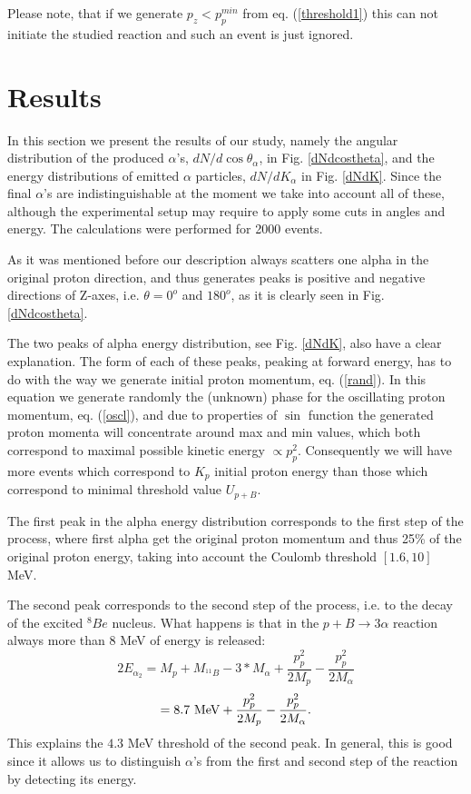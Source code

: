 \documentclass[aps,prc,twocolumn,floatfix,showpacs,a4paper,
nofootinbib,amsmath,amssymb]{revtex4}
\newcommand{\be}{\begin{equation}}
\newcommand{\ee}{\end{equation}}
\begin{document}
Please note, that if we generate $p_z < p_p^{min}$ from eq. (\ref{threshold1}) this can not initiate the studied reaction and such an event is just ignored.  


\section{Results}



In this section we present the results of our study, namely the angular distribution of the produced $\alpha$'s, $dN/d\cos\theta_\alpha$,  in Fig. \ref{dNdcostheta},  and the energy distributions of emitted $\alpha$ particles, $dN/dK_{\alpha}$ in Fig. \ref{dNdK}. Since the final $\alpha$'s are indistinguishable at the moment we take into account all of these, although the experimental setup may require to apply some cuts in angles and energy. The calculations were performed for 2000 events.  

As it was mentioned before our description always scatters one alpha in the original proton direction, and thus generates peaks is positive and negative directions of Z-axes, i.e. $\theta=0^o$ and $180^o$, as it is clearly seen in Fig. \ref{dNdcostheta}.   

The two peaks of alpha energy distribution, see Fig. \ref{dNdK}, also have a clear explanation. The form of each of these peaks, peaking at forward energy, has to do with the way we generate initial proton momentum, eq. (\ref{rand}). In this equation we generate randomly the (unknown) phase for the oscillating proton momentum, eq. (\ref{oscl}), and due to properties of $\sin$ function the generated proton momenta will concentrate around max and min values, which both 
correspond to maximal possible kinetic energy $\propto p_p^2$. Consequently we will have more events which correspond to $K_p$ initial proton energy than those which correspond to minimal threshold value $U_{p+B}$.

The first peak in the alpha energy distribution corresponds to the first step of the process, where first alpha get the original proton momentum and thus 25\% of the original proton energy, taking into account the Coulomb threshold $[1.6,10]$ MeV.  

The second peak corresponds to the second step of the process, i.e. to the decay of the excited $^8Be$ nucleus. What happens is that in the $p+B \rightarrow 3 \alpha$ reaction always more than $8$ MeV of energy is released: 
$$
2 E_{\alpha_{2}} = M_p + M_{^{11}B} -  3*M_{\alpha} + \frac{p_p^2}{2M_p}  -  \frac{p_p^2}{2M_{\alpha}}
$$
\be
=8.7\ {\rm MeV} +  \frac{p_p^2}{2M_p}  -  \frac{p_p^2}{2M_{\alpha}}.
\label{alpha2}
\ee
This explains the $4.3$ MeV threshold of the second peak. In general, this is good since it allows us to distinguish $\alpha$'s from the first and second step of the reaction by detecting its energy.       





\end{document}
